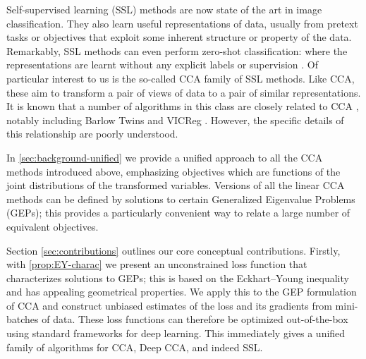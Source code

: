 Self-supervised learning (SSL) methods are now state of the art in image classification.
They also learn useful representations of data, usually from pretext tasks or objectives that exploit some inherent structure or property of the data.
Remarkably, SSL methods can even perform zero-shot classification: where the representations are learnt without any explicit labels or supervision \citep{balestriero2023cookbook}.
Of particular interest to us is the so-called CCA family %
of SSL methods.
Like CCA, these aim to transform a pair of views of data to a pair of similar representations.
It is known that a number of algorithms in this class are closely related to CCA \citep{balestriero2022contrastive}, notably including Barlow Twins \citep{zbontar2021barlow} and VICReg \citep{bardes2021vicreg}.
However, the specific details of this relationship are poorly understood.

In \cref{sec:background-unified} we provide a unified approach to all the CCA methods introduced above, emphasizing objectives which are functions of the joint distributions of the transformed variables.
Versions of all the linear CCA methods can be defined by solutions to certain Generalized Eigenvalue Problems (GEPs); this provides a particularly convenient way to relate a large number of equivalent objectives.

Section \ref{sec:contributions} outlines our core conceptual contributions.
Firstly, with \cref{prop:EY-charac} we present an unconstrained loss function that characterizes solutions to GEPs; this is based on the Eckhart--Young inequality and has appealing geometrical properties.
We apply this to the GEP formulation of CCA and construct unbiased estimates of the loss and its gradients from mini-batches of data.
These loss functions can therefore be optimized out-of-the-box using standard frameworks for deep learning. %
This immediately gives a unified family of algorithms for CCA, Deep CCA, and indeed SSL.

